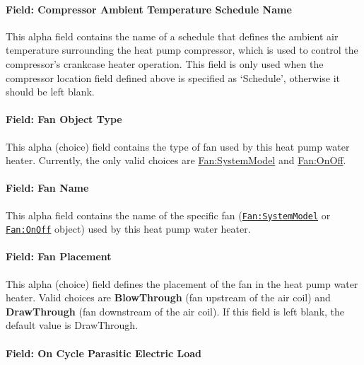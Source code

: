 \paragraph{Field: Compressor Ambient Temperature Schedule Name}\label{field-compressor-ambient-temperature-schedule-name}

This alpha field contains the name of a schedule that defines the ambient air temperature surrounding the heat pump compressor, which is used to control the compressor's crankcase heater operation. This field is only used when the compressor location field defined above is specified as `Schedule', otherwise it should be left blank.

\paragraph{Field: Fan Object Type}\label{field-fan-object-type-001}

This alpha (choice) field contains the type of fan used by this heat pump water heater. Currently, the only valid choices are \hyperref[fansystemmodel]{Fan:SystemModel} and \hyperref[fanonoff]{Fan:OnOff}.

\paragraph{Field: Fan Name}\label{field-fan-name-004}

This alpha field contains the name of the specific fan (\hyperref[fansystemmodel]{\lstinline!Fan:SystemModel!} or \hyperref[fanonoff]{\lstinline!Fan:OnOff!} object) used by this heat pump water heater.

\paragraph{Field: Fan Placement}\label{field-fan-placement-000}

This alpha (choice) field defines the placement of the fan in the heat pump water heater. Valid choices are \textbf{BlowThrough} (fan upstream of the air coil) and \textbf{DrawThrough} (fan downstream of the air coil). If this field is left blank, the default value is DrawThrough.

\paragraph{Field: On Cycle Parasitic Electric Load}\label{field-on-cycle-parasitic-electric-load-000}

